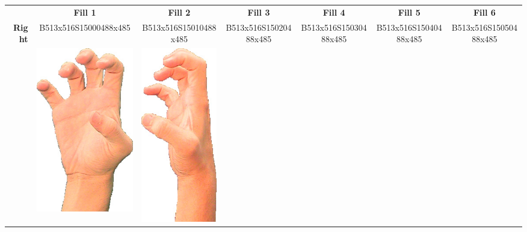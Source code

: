 \documentclass{article}
\begin{document}
\begin{center}
\begin{tabular}{r*{6}{c}}
&\textbf{Fill 1}&\textbf{Fill 2}&\textbf{Fill 3}&\textbf{Fill 4}&\textbf{Fill 5}&\textbf{Fill 6}\\
\multirow{2}{*}{\textbf{Right}}&
B513x516S15000488x485&
B513x516S15010488x485&
B513x516S15020488x485&
B513x516S15030488x485&
B513x516S15040488x485&
B513x516S15050488x485\\
&
\includegraphics[scale=0.1]{images/05-05-1.jpg}&
\includegraphics[scale=0.1]{images/05-05-2.jpg}&

\end{tabular}
\end{center}
\end{document}
